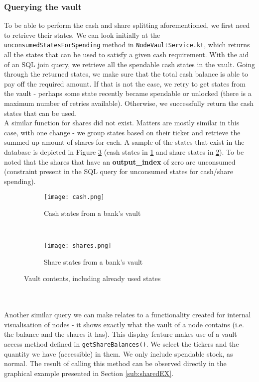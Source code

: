 \documentclass[12pt,twoside]{article}
\begin{document}
\subsubsection{Querying the vault}
\label{sub:query}
To be able to perform the cash and share splitting aforementioned, we first need to retrieve their states. We can look initially at the \verb|unconsumedStatesForSpending| method in  \verb|NodeVaultService.kt|, which returns all the states that can be used to satisfy a given cash requirement. With the aid of an SQL join query, we retrieve all the spendable cash states in the vault. Going through the returned states, we make sure that the total cash balance is able to pay off the required amount. If that is not the case, we retry to get states from the vault - perhaps some state recently became spendable or unlocked (there is a maximum number of retries available). Otherwise, we successfully return the cash states that can be used. 
\\
A similar function for shares did not exist. Matters are mostly similar in this case, with one change - we group states based on their ticker and retrieve the summed up amount of shares for each. A sample of the states that exist in the database is depicted in Figure \ref{fig:shareStates} (cash states in \ref{fig:cash} and share states in \ref{fig:shares}). To be noted that the shares that have an \textbf{output\_index} of zero are unconsumed (constraint present in the SQL query for unconsumed states for cash/share spending).
\begin{figure}[!htb]
    \centering
    \begin{subfigure}[b]{1\textwidth}
    	\centering
        \texttt{[image: cash.png]}
        \caption{Cash states from a bank's vault}
        \label{fig:cash}
    \end{subfigure}
    ~
    \begin{subfigure}[b]{0.8\textwidth}
    	\centering
        \texttt{[image: shares.png]}
        \caption{Share states from a bank's vault}
        \label{fig:shares}
    \end{subfigure}
    \caption{Vault contents, including already used states}
    \label{fig:shareStates}
\end{figure}
\\ \\
Another similar query we can make relates to a functionality created for internal visualisation of nodes - it shows exactly what the vault of a node contains (i.e. the balance and the shares it has). This display feature makes use of a vault access method defined in \verb|getShareBalances()|. We select the tickers and the quantity we have (accessible) in them. We only include spendable stock, as normal. The result of calling this method can be observed directly in the graphical example presented in Section \ref{sub:sharedEX}. 
\end{document}
